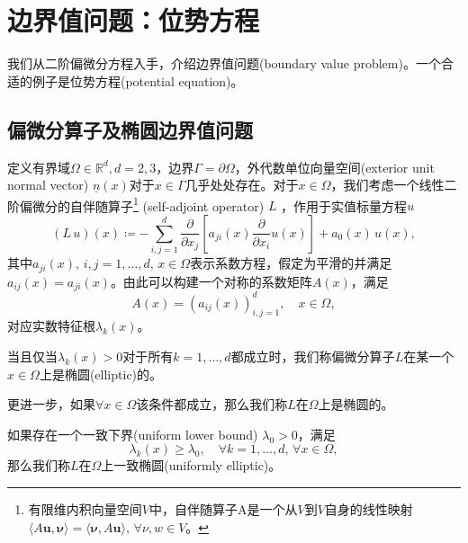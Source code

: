 \section{边界值问题：位势方程}
\label{sec:bem-fem-potential-bvp}
我们从二阶偏微分方程入手，介绍边界值问题(boundary value problem)。一个合适的例子是位势方程(potential equation)。

\subsection{偏微分算子及椭圆边界值问题}

定义有界域$\Omega \in \mathbb{R}^d, d=2,3$，边界$\Gamma = \partial \Omega$，外代数单位向量空间(exterior unit normal vector) $\underline{n}(x)$对于$x \in \Gamma$几乎处处存在。对于$x \in \Omega$，我们考虑一个线性二阶偏微分的自伴随算子\footnote{有限维内积向量空间$V$中，自伴随算子A是一个从$V$到$V$自身的线性映射$\langle A \bm{u}, \bm{\nu} \rangle = \langle \bm{\nu}, A \bm{u} \rangle, \, \forall \nu, w \in V$。}
(self-adjoint operator) $L$
，作用于实值标量方程$u$
\begin{equation}
  \label{eq:bvp-self-adjoint-pde-operator}
  \left( L \, u \right)(x) \coloneqq - \sum_{i,j=1}^d \frac{\partial}{\partial x_j} \left[ a_{ji} (x) \frac{\partial}{\partial x_i} u(x)\right] + a_0(x)\, u(x),
\end{equation}
其中$a_{ji}(x), \, i,j =1,\ldots, d, \, x \in \Omega$表示系数方程，假定为平滑的并满足$a_{ij}(x) = a_{ji}(x)$。由此可以构建一个对称的系数矩阵$A(x)$，满足
\begin{equation*}
  A(x) = \left( a_{ij}(x) \right)_{i,j=1}^{d}, \quad x \in \Omega,
\end{equation*}
对应实数特征根$\lambda_{k}(x)$。

当且仅当$\lambda_{k}(x) > 0$对于所有$k=1,\ldots,d$都成立时，我们称偏微分算子$L$在某一个$x \in \Omega$上是椭圆(elliptic)的。

更进一步，如果$\forall x \in \Omega$该条件都成立，那么我们称$L$在$\Omega$上是椭圆的。

如果存在一个一致下界(uniform lower bound) $\lambda_0 > 0$，满足
\begin{equation}
  \label{eq:bvp-def-uniformly-elliptic}
  \lambda_k (x) \ge \lambda_0, \quad \forall k = 1,\ldots,d, \, \forall x \in \Omega,
\end{equation}
那么我们称$L$在$\Omega$上一致椭圆(uniformly elliptic)。


